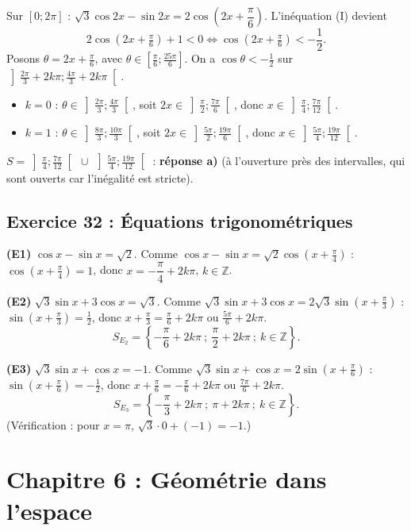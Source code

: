 Sur $[0;2\pi]$ : $\sqrt3\cos2x-\sin2x=2\cos\left(2x+\dfrac{\pi}{6}\right)$. L'in\'equation (I) devient
\[
2\cos\left(2x+\tfrac{\pi}{6}\right)+1<0\iff\cos\left(2x+\tfrac{\pi}{6}\right)<-\frac12.
\]
Posons $\theta=2x+\frac{\pi}{6}$, avec $\theta\in\left[\frac{\pi}{6};\frac{25\pi}{6}\right]$. On a $\cos\theta<-\frac12$ sur
$\left]\frac{2\pi}{3}+2k\pi;\frac{4\pi}{3}+2k\pi\right[$.
\begin{itemize}
  \item $k=0$ : $\theta\in\left]\frac{2\pi}{3};\frac{4\pi}{3}\right[$, soit $2x\in\left]\frac{\pi}{2};\frac{7\pi}{6}\right[$, donc $x\in\left]\frac{\pi}{4};\frac{7\pi}{12}\right[$.
  \item $k=1$ : $\theta\in\left]\frac{8\pi}{3};\frac{10\pi}{3}\right[$, soit $2x\in\left]\frac{5\pi}{2};\frac{19\pi}{6}\right[$, donc $x\in\left]\frac{5\pi}{4};\frac{19\pi}{12}\right[$.
\end{itemize}
\textbf{$S=\left]\frac{\pi}{4};\frac{7\pi}{12}\right[\ \cup\ \left]\frac{5\pi}{4};\frac{19\pi}{12}\right[$} : \textbf{r\'eponse a)}
(\`a l'ouverture pr\`es des intervalles, qui sont ouverts car l'in\'egalit\'e est stricte).

\subsection{Exercice 32 : \'Equations trigonom\'etriques}

\textbf{(E1)} $\cos x-\sin x=\sqrt2$. Comme $\cos x-\sin x=\sqrt2\cos\left(x+\frac{\pi}{4}\right)$ : $\cos\left(x+\frac{\pi}{4}\right)=1$,
donc $x=-\dfrac{\pi}{4}+2k\pi$, $k\in\mathbb Z$.

\textbf{(E2)} $\sqrt3\sin x+3\cos x=\sqrt3$. Comme $\sqrt3\sin x+3\cos x=2\sqrt3\sin\left(x+\frac{\pi}{3}\right)$ :
$\sin\left(x+\frac{\pi}{3}\right)=\frac12$, donc $x+\frac{\pi}{3}=\frac{\pi}{6}+2k\pi$ ou $\frac{5\pi}{6}+2k\pi$.
\[
S_{E_2}=\left\{-\frac{\pi}{6}+2k\pi\ ;\ \frac{\pi}{2}+2k\pi\ ;\ k\in\mathbb Z\right\}.
\]

\textbf{(E3)} $\sqrt3\sin x+\cos x=-1$. Comme $\sqrt3\sin x+\cos x=2\sin\left(x+\frac{\pi}{6}\right)$ :
$\sin\left(x+\frac{\pi}{6}\right)=-\frac12$, donc $x+\frac{\pi}{6}=-\frac{\pi}{6}+2k\pi$ ou $\frac{7\pi}{6}+2k\pi$.
\[
S_{E_3}=\left\{-\frac{\pi}{3}+2k\pi\ ;\ \pi+2k\pi\ ;\ k\in\mathbb Z\right\}.
\]
(V\'erification : pour $x=\pi$, $\sqrt3\cdot0+(-1)=-1$.)

\section{Chapitre 6 : G\'eom\'etrie dans l'espace}

